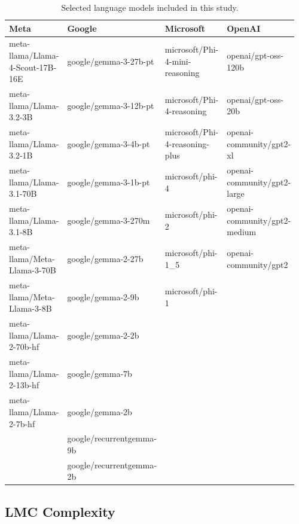 \begin{enumerate}
        \begin{table}[H]
            \begin{tabular}{p{0.24\linewidth} p{0.24\linewidth} p{0.24\linewidth} p{0.24\linewidth}}
                \hline
                Meta & Google & Microsoft & OpenAI \\
                \hline
                meta-llama/Llama-4-Scout-17B-16E & google/gemma-3-27b-pt & microsoft/Phi-4-mini-reasoning & openai/gpt-oss-120b \\
                meta-llama/Llama-3.2-3B & google/gemma-3-12b-pt & microsoft/Phi-4-reasoning & openai/gpt-oss-20b \\
                meta-llama/Llama-3.2-1B & google/gemma-3-4b-pt & microsoft/Phi-4-reasoning-plus & openai-community/gpt2-xl \\
                meta-llama/Llama-3.1-70B & google/gemma-3-1b-pt & microsoft/phi-4 & openai-community/gpt2-large \\
                meta-llama/Llama-3.1-8B & google/gemma-3-270m & microsoft/phi-2 & openai-community/gpt2-medium \\
                meta-llama/Meta-Llama-3-70B & google/gemma-2-27b & microsoft/phi-1\_5 & openai-community/gpt2 \\
                meta-llama/Meta-Llama-3-8B & google/gemma-2-9b & microsoft/phi-1 & \\
                meta-llama/Llama-2-70b-hf & google/gemma-2-2b &  & \\
                meta-llama/Llama-2-13b-hf & google/gemma-7b &  & \\
                meta-llama/Llama-2-7b-hf & google/gemma-2b &  & \\
                 & google/recurrentgemma-9b &  & \\
                 & google/recurrentgemma-2b &  & \\
                \hline
            \end{tabular}
            \caption{Selected language models included in this study.}
            \label{tab:selected_models}
        \end{table}
    

\end{enumerate}



\subsection{LMC Complexity}

